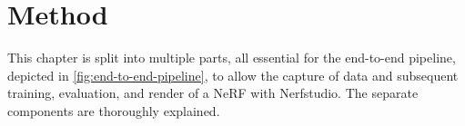 \chapter{Method}

This chapter is split into multiple parts, all essential for the end-to-end pipeline, depicted in \autoref{fig:end-to-end-pipeline}, to allow the capture of data and subsequent training, evaluation, and render of a NeRF with Nerfstudio. The separate components are thoroughly explained.




